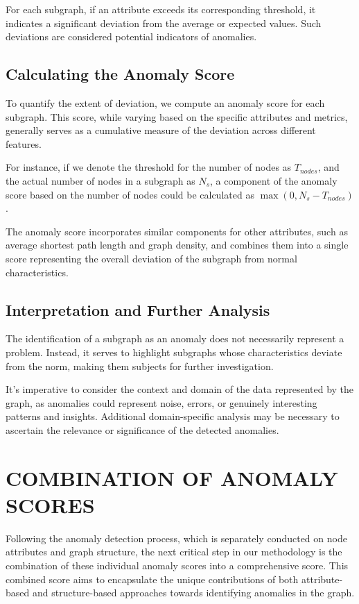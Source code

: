 \documentclass[10pt,twocolumn,a4paper]{article}
\begin{document}
For each subgraph, if an attribute exceeds its corresponding threshold, it indicates a significant deviation from the average or expected values. Such deviations are considered potential indicators of anomalies.

\subsection{Calculating the Anomaly Score}

To quantify the extent of deviation, we compute an anomaly score for each subgraph. This score, while varying based on the specific attributes and metrics, generally serves as a cumulative measure of the deviation across different features.

For instance, if we denote the threshold for the number of nodes as $T_{nodes}$, and the actual number of nodes in a subgraph as $N_{s}$, a component of the anomaly score based on the number of nodes could be calculated as $\max(0, N_{s} - T_{nodes})$.

The anomaly score incorporates similar components for other attributes, such as average shortest path length and graph density, and combines them into a single score representing the overall deviation of the subgraph from normal characteristics.

\subsection{Interpretation and Further Analysis}

The identification of a subgraph as an anomaly does not necessarily represent a problem. Instead, it serves to highlight subgraphs whose characteristics deviate from the norm, making them subjects for further investigation.

It’s imperative to consider the context and domain of the data represented by the graph, as anomalies could represent noise, errors, or genuinely interesting patterns and insights. Additional domain-specific analysis may be necessary to ascertain the relevance or significance of the detected anomalies.

\section{COMBINATION OF ANOMALY SCORES}

Following the anomaly detection process, which is separately conducted on node attributes and graph structure, the next critical step in our methodology is the combination of these individual anomaly scores into a comprehensive score. This combined score aims to encapsulate the unique contributions of both attribute-based and structure-based approaches towards identifying anomalies in the graph.
\end{document}
